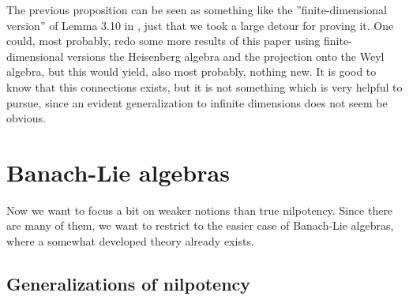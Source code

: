 The previous proposition can be seen as something like the ''finite-dimensional 
version'' of Lemma 3.10 in \cite{waldmann:2014a}, just that we took a large 
detour for proving it. One could, most probably, redo some more results of this 
paper using finite-dimensional versions the Heisenberg algebra and the 
projection onto the Weyl algebra, but this would yield, also most probably, 
nothing new. It is good to know that this connections exists, but it is not 
something which is very helpful to pursue, since an evident generalization to 
infinite dimensions does not seem be obvious.




\section{Banach-Lie algebras}
\label{sec:chap6_TheEProperty}

Now we want to focus a bit on weaker notions than true nilpotency. Since there 
are many of them, we want to restrict to the easier case of Banach-Lie algebras, 
where a somewhat developed theory already exists.


\subsection{Generalizations of nilpotency}

